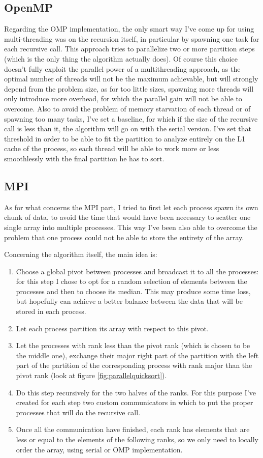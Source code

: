 \documentclass{article}
\begin{document}
	\subsection{OpenMP}
	Regarding the OMP implementation, the only smart way I've come up for using multi-threading was on the recursion itself, in particular by spawning one task for each recursive call. This approach tries to parallelize two or more partition steps (which is the only thing the algorithm actually does). Of course this choice doesn't fully exploit the parallel power of a multithreading approach, as the optimal number of threads will not be the maximum achievable, but will strongly depend from the problem size, as for too little sizes, spawning more threads will only introduce more overhead, for which the parallel gain will not be able to overcome.
	Also to avoid the problem of memory starvation of each thread or of spawning too many tasks, I've set a baseline, for which if the size of the recursive call is less than it, the algorithm will go on with the serial version. I've set that threshold in order to be able to fit the partition to analyze entirely on the L1 cache of the process, so each thread will be able to work more or less smoothlessly with the final partition he has to sort.
	
	\subsection{MPI}
	As for what concerns the MPI part, I tried to first let each process spawn its own chunk of data, to avoid the time that would have been necessary to scatter one single array into multiple processes. This way I've been also able to overcome the problem that one process could not be able to store the entirety of the array.
	
	Concerning the algorithm itself, the main idea is:
	\begin{enumerate}
		\item Choose a global pivot between processes and broadcast it to all the processes: for this step I chose to opt for a random selection of elements between the processes and then to choose its median. This may produce some time loss, but hopefully can achieve a better balance between the data that will be stored in each process.
		\item Let each process partition its array with respect to this pivot.
		\item Let the processes with rank less than the pivot rank (which is chosen to be the middle one), exchange their major right part of the partition with the left part of the partition of the corresponding process with rank major than the pivot rank (look at figure \ref{fig:parallelquicksort}).
		\item Do this step recursively for the two halves of the ranks. For this purpose I've created for each step two custom communicators in which to put the proper processes that will do the recursive call.
		\item Once all the communication have finished, each rank has elements that are less or equal to the elements of the following ranks, so we only need to locally order the array, using serial or OMP implementation.
	\end{enumerate}
	
\end{document}
